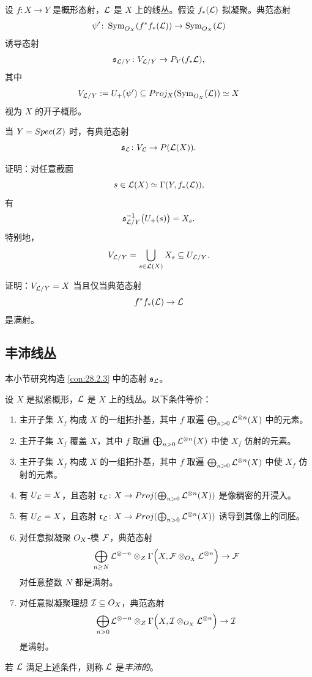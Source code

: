 \begin{construction}\label{con:28.2.3}
设 $f\colon X\to Y$ 是概形态射，$\mathcal{L}$ 是 $X$ 上的线丛。假设 $f_*(\mathcal{L})$ 拟凝聚。典范态射
\[
\psi'\colon \operatorname{Sym}_{O_X}(f^*f_*(\mathcal{L})) \to \operatorname{Sym}_{O_X}(\mathcal{L})
\]
诱导态射
\[
\mathfrak s_{\mathcal{L}/Y}\colon V_{\mathcal{L}/Y} \to P_Y(f_*\mathcal{L}),
\]
其中
\[
V_{\mathcal{L}/Y} := U_+(\psi') \subseteq Proj_X(\operatorname{Sym}_{O_X}(\mathcal{L})) \simeq X
\]
视为 $X$ 的开子概形。

当 $Y=Spec(Z)$ 时，有典范态射
\[
\mathfrak s_{\mathcal{L}}\colon V_{\mathcal{L}} \to P(\mathcal{L}(X)).
\]
\end{construction}

\begin{exercise}\label{exc:28.2.4}
证明：对任意截面
\[
s\in\mathcal{L}(X)\simeq\Gamma(Y,f_*(\mathcal{L})),
\]
有
\[
\mathfrak s_{\mathcal{L}/Y}^{-1}\bigl(U_+(s)\bigr) = X_s.
\]
特别地，
\[
V_{\mathcal{L}/Y} = \bigcup_{s\in\mathcal{L}(X)}X_s \subseteq U_{\mathcal{L}/Y}.
\]
\end{exercise}

\begin{exercise}\label{exc:28.2.5}
证明：$V_{\mathcal{L}/Y}=X$ 当且仅当典范态射
\[
f^*f_*(\mathcal{L}) \to \mathcal{L}
\]
是满射。
\end{exercise}

\subsection{丰沛线丛}\label{sec:28.3}

本小节研究构造 \ref{con:28.2.3} 中的态射 $\mathfrak s_{\mathcal{L}}$。

\begin{propdef}\label{prop:28.3.1}
设 $X$ 是拟紧概形，$\mathcal{L}$ 是 $X$ 上的线丛。以下条件等价：
\begin{enumerate}[label=(\alph*),leftmargin=2.6em,itemsep=0.3ex]
  \item 主开子集 $X_f$ 构成 $X$ 的一组拓扑基，其中 $f$ 取遍 $\bigoplus_{n>0}\mathcal{L}^{\otimes n}(X)$ 中的元素。
  \item[\textup{(a')}] 主开子集 $X_f$ 覆盖 $X$，其中 $f$ 取遍 $\bigoplus_{n>0}\mathcal{L}^{\otimes n}(X)$ 中使 $X_f$ 仿射的元素。
  \item[\textup{(a'')}] 主开子集 $X_f$ 构成 $X$ 的一组拓扑基，其中 $f$ 取遍 $\bigoplus_{n>0}\mathcal{L}^{\otimes n}(X)$ 中使 $X_f$ 仿射的元素。
  \item 有 $U_{\mathcal{L}}=X$，且态射 $\mathfrak r_{\mathcal{L}}\colon X\to Proj(\bigoplus_{n>0}\mathcal{L}^{\otimes n}(X))$ 是像稠密的开浸入。
  \item[\textup{(b')}] 有 $U_{\mathcal{L}}=X$，且态射 $\mathfrak r_{\mathcal{L}}\colon X\to Proj(\bigoplus_{n>0}\mathcal{L}^{\otimes n}(X))$ 诱导到其像上的同胚。
  \item 对任意拟凝聚 $O_X$-模 $\mathcal{F}$，典范态射
  \[
  \bigoplus_{n\ge N}\mathcal{L}^{\otimes -n}\otimes_{Z}\Gamma\Bigl(X,\mathcal{F}\otimes_{O_X}\mathcal{L}^{\otimes n}\Bigr) \to \mathcal{F}
  \]
  对任意整数 $N$ 都是满射。
  \item[\textup{(c')}] 对任意拟凝聚理想 $\mathcal{I}\subseteq O_X$，典范态射
  \[
  \bigoplus_{n>0}\mathcal{L}^{\otimes -n}\otimes_{Z}\Gamma\Bigl(X,\mathcal{I}\otimes_{O_X}\mathcal{L}^{\otimes n}\Bigr) \to \mathcal{I}
  \]
  是满射。
\end{enumerate}
若 $\mathcal{L}$ 满足上述条件，则称 $\mathcal{L}$ 是\emph{丰沛的}。
\end{propdef}

